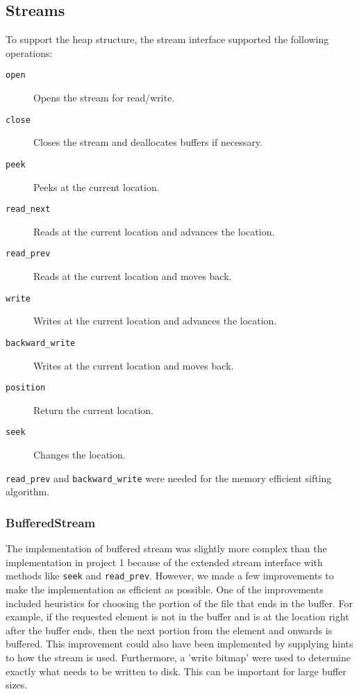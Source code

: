 \subsection{Streams}

To support the heap structure, the stream interface supported the following operations:

\begin{description}
\item[{\texttt{open}}] Opens the stream for read/write.
\item[{\texttt{close}}] Closes the stream and deallocates buffers if necessary.
\item[{\texttt{peek}}] Peeks at the current location.
\item[{\texttt{read\_next}}] Reads at the current location and advances the location.
\item[{\texttt{read\_prev}}] Reads at the current location and moves back.
\item[{\texttt{write}}] Writes at the current location and advances the location.
\item[{\texttt{backward\_write}}] Writes at the current location and moves back.
\item[{\texttt{position}}] Return the current location.
\item[{\texttt{seek}}] Changes the location.
\end{description}

\texttt{read\_prev} and \texttt{backward\_write} were needed for the memory efficient sifting algorithm.

\subsubsection{BufferedStream}

The implementation of buffered stream was slightly more complex than the implementation in project 1 because of the extended stream interface with methods like \texttt{seek} and \texttt{read\_prev}. However, we made a few improvements to make the implementation as efficient as possible. One of the improvements included heuristics for choosing the portion of the file that ends in the buffer. For example, if the requested element is not in the buffer and is at the location right after the buffer ends, then the next portion from the element and onwards is buffered. This improvement could also have been implemented by supplying hints to how the stream is used. Furthermore, a 'write bitmap' were used to determine exactly what needs to be written to disk. This can be important for large buffer sizes.

